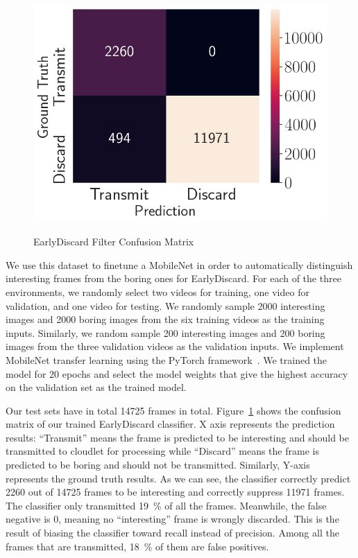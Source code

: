 \begin{figure}[h]
\centering
\includegraphics[width=.6\linewidth]{FIGS/earlydiscard-cm}\\
\caption{EarlyDiscard Filter Confusion Matrix}
\label{fig:wca-early-discard}
\end{figure}

We use this dataset to finetune a MobileNet in order to automatically
distinguish interesting frames from the boring ones for EarlyDiscard. For each
of the three environments, we randomly select two videos for training, one video
for validation, and one video for testing. We randomly sample 2000 interesting
images and 2000 boring images from the six training videos as the training
inputs. Similarly, we random sample 200 interesting images and 200 boring images
from the three validation videos as the validation inputs. We implement
MobileNet transfer learning using the PyTorch
framework~\cite{paszke2019pytorch}. We trained the model for 20 epochs and
select the model weights that give the highest accuracy on the validation set as
the trained model.

Our test sets have in total 14725 frames in total.
Figure~\ref{fig:wca-early-discard} shows the confusion matrix of our trained
EarlyDiscard classifier. X axis represents the prediction results: ``Transmit''
means the frame is predicted to be interesting and should be transmitted to
cloudlet for processing while ``Discard'' means the frame is predicted to be
boring and should not be transmitted. Similarly, Y-axis represents the ground
truth results. As we can see, the classifier correctly predict 2260 out of 14725
frames to be interesting and correctly suppress 11971 frames. The classifier
only transmitted 19~\% of all the frames. Meanwhile, the false negative is 0,
meaning no ``interesting'' frame is wrongly discarded. This is the result of
biasing the classifier toward recall instead of precision. Among all the frames
that are transmitted, 18~\% of them are false positives.

